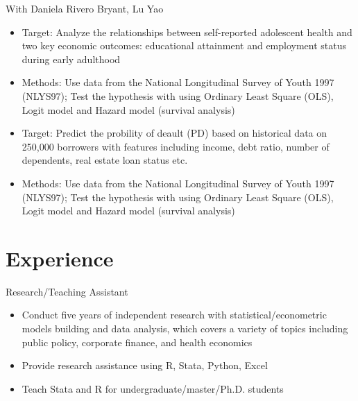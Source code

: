 \documentclass{resume}
\begin{document}
With Daniela Rivero Bryant, Lu Yao
\begin{itemize}
  \item Target: Analyze the relationships between self-reported adolescent health and two key economic outcomes: educational attainment and employment status during early adulthood
  \item Methods: Use data from the National Longitudinal Survey of Youth 1997 (NLYS97); Test the hypothesis with using Ordinary Least Square (OLS), Logit model and Hazard model (survival analysis) 
  \end{itemize}
  
\begin{itemize}
  \item Target: Predict the probility of deault (PD) based on historical data on 250,000 borrowers with features including income, debt ratio, number of dependents, real estate loan status etc.
  \item Methods: Use data from the National Longitudinal Survey of Youth 1997 (NLYS97); Test the hypothesis with using Ordinary Least Square (OLS), Logit model and Hazard model (survival analysis) 
  \end{itemize}

\section{Experience}
Research/Teaching Assistant
\begin{itemize}
  \item Conduct five years of independent research with statistical/econometric models building and data analysis, which covers a variety of topics including public policy, corporate finance, and health economics
  \item Provide research assistance using R, Stata, Python, Excel
  \item Teach Stata and R for undergraduate/master/Ph.D. students
\end{itemize}
\end{document}
